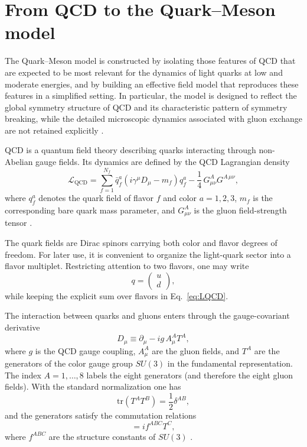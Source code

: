 \section{From QCD to the Quark--Meson model}

The Quark--Meson model is constructed by isolating those features of
QCD that are expected to be most relevant for
the dynamics of light quarks at low and moderate energies, and by
building an effective field model that reproduces these features in
a simplified setting. In particular, the model is designed to reflect
the global symmetry structure of QCD and its characteristic pattern
of symmetry breaking, while the detailed microscopic dynamics
associated with gluon exchange are not retained explicitly
\cite{WeinbergQFT,PeskinSchroeder1995}.

QCD is a quantum field theory describing quarks interacting through
non-Abelian gauge fields. Its dynamics are defined by the QCD
Lagrangian density
\begin{equation}
\mathcal{L}_{\mathrm{QCD}}
= \sum_{f=1}^{N_f} \bar{q}_f^a\!\left(i\gamma^\mu D_\mu - m_f\right)\!q_f^a
- \frac{1}{4}\,G^A_{\mu\nu} G^{A\,\mu\nu},
\label{eq:LQCD}
\end{equation}
where $q_f^a$ denotes the quark field of flavor $f$ and color
$a=1,2,3$, $m_f$ is the corresponding bare quark mass parameter, and
$G^A_{\mu\nu}$ is the gluon field-strength tensor
\cite{PeskinSchroeder1995,Weinberg1995}.

The quark fields are Dirac spinors carrying both color and flavor
degrees of freedom. For later use, it is convenient to organize the
light-quark sector into a flavor multiplet. Restricting attention to
two flavors, one may write
\begin{equation}
q =
\begin{pmatrix}
u \\ d
\end{pmatrix},
\end{equation}
while keeping the explicit sum over flavors in
Eq.~\eqref{eq:LQCD}.

The interaction between quarks and gluons enters through the
gauge-covariant derivative
\begin{equation}
D_\mu \equiv \partial_\mu - i g\,A_\mu^A T^A,
\label{eq:covder}
\end{equation}
where $g$ is the QCD gauge coupling, $A_\mu^A$ are the gluon fields,
and $T^A$ are the generators of the color gauge group $SU(3)$ in the
fundamental representation. The index $A=1,\ldots,8$ labels the eight
generators (and therefore the eight gluon fields). With the standard
normalization one has
\begin{equation}
\mathrm{tr}(T^A T^B) = \frac{1}{2}\delta^{AB},
\end{equation}
and the generators satisfy the commutation relations
\begin{equation}
[T^A,T^B] = i f^{ABC} T^C,
\end{equation}
where $f^{ABC}$ are the structure constants of $SU(3)$
\cite{PeskinSchroeder1995}.

